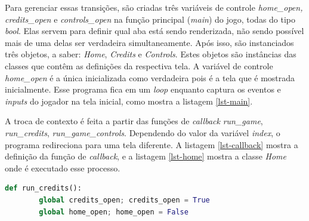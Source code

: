 
Para gerenciar essas transições, são criadas três variáveis de controle \textit{home\_open, credits\_open} e \textit{controls\_open} na função principal (\textit{main}) do jogo, todas do tipo \textit{bool}. Elas servem para definir qual aba está sendo renderizada, não sendo possível mais de uma delas ser verdadeira simultaneamente. Após isso, são instanciados três objetos, a saber: \textit{Home}, \textit{Credits} e \textit{Controls}. Estes objetos são instâncias das classes que contêm as definições da respectiva tela. A variável de controle \textit{home\_open} é a única inicializada como verdadeira pois é a tela que é mostrada inicialmente. Esse programa fica em um \textit{loop} enquanto captura os eventos e \textit{inputs} do jogador na tela inicial, como mostra a listagem \ref{lst-main}.



A troca de contexto é feita a partir das funções de \textit{callback} \textit{run\_game}, \textit{run\_credits}, \textit{run\_game\_controls}. Dependendo do valor da variável \textit{index}, o programa redireciona para uma tela diferente. A listagem \ref{lst-callback} mostra a definição da função de \textit{callback}, e a listagem \ref{lst-home} mostra a classe \textit{Home} onde é executado esse processo.

\begin{lstlisting}[label= lst-callback,language=Python,breaklines, caption= Função de \textit{callback} responsávél por alterar a variável de controle.]
    def run_credits():
        global credits_open; credits_open = True
        global home_open; home_open = False
\end{lstlisting}



\clearpage

